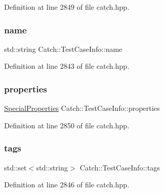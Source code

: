 Definition at line 2849 of file catch.\+hpp.

\hypertarget{struct_catch_1_1_test_case_info_a463794e2f5cfead307c93efd134ade36}{}\label{struct_catch_1_1_test_case_info_a463794e2f5cfead307c93efd134ade36} 
\subsubsection{\texorpdfstring{name}{name}}
{\footnotesize\ttfamily std\+::string Catch\+::\+Test\+Case\+Info\+::name}



Definition at line 2843 of file catch.\+hpp.

\hypertarget{struct_catch_1_1_test_case_info_afc1e84bd7a2e180895a06d9131302af0}{}\label{struct_catch_1_1_test_case_info_afc1e84bd7a2e180895a06d9131302af0} 
\subsubsection{\texorpdfstring{properties}{properties}}
{\footnotesize\ttfamily \hyperlink{struct_catch_1_1_test_case_info_a39b232f74b4a7a6f2183b96759027eac}{Special\+Properties} Catch\+::\+Test\+Case\+Info\+::properties}



Definition at line 2850 of file catch.\+hpp.

\hypertarget{struct_catch_1_1_test_case_info_a045f62e7719a8760a5b456f7fd2dc97c}{}\label{struct_catch_1_1_test_case_info_a045f62e7719a8760a5b456f7fd2dc97c} 
\subsubsection{\texorpdfstring{tags}{tags}}
{\footnotesize\ttfamily std\+::set$<$std\+::string$>$ Catch\+::\+Test\+Case\+Info\+::tags}



Definition at line 2846 of file catch.\+hpp.

\hypertarget{struct_catch_1_1_test_case_info_ac65c2d36fd36f71e9bf782b2ea245c64}{}\label{struct_catch_1_1_test_case_info_ac65c2d36fd36f71e9bf782b2ea245c64} 
